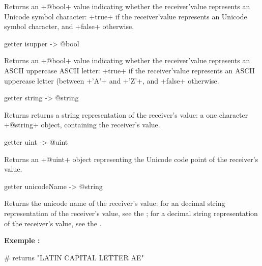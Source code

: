 Returns an \ggst+@bool+ value indicating whether the receiver'value represents an Unicode symbol character: \ggst+true+ if the receiver'value represents an Unicode symbol character, and \ggst+false+ otherwise.










\begin{galgas3}
getter isupper -> @bool
\end{galgas3}

Returns an \ggst+@bool+ value indicating whether the receiver'value represents an ASCII uppercase ASCII letter: \ggst+true+ if the receiver'value represents an ASCII uppercase letter (between \ggst+'A'+ and \ggst+'Z'+, and \ggst+false+ otherwise.






\begin{galgas3}
getter string -> @string
\end{galgas3}

Returns returns a string representation of the receiver's value: a one character \ggst+@string+ object, containing the receiver's value.





\begin{galgas3}
getter uint -> @uint
\end{galgas3}

Returns an \ggst+@uint+ object representing the Unicode code point of the receiver's value.





\begin{galgas3}
getter unicodeName -> @string
\end{galgas3}

Returns the unicode name of the receiver's value: for an decimal string representation of the receiver's value, see the ; for a decimal string representation of the receiver's value, see the .

\textbf{Exemple :}
\begin{galgas3}
['Æ' unicodeName] # returns "LATIN CAPITAL LETTER AE"
\end{galgas3}




